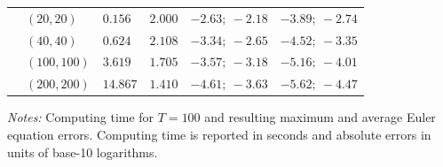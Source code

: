 \documentclass[a4paper,12pt]{article}
\begin{document}
\begin{table}[htb]
\begin{threeparttable}
\begin{tabular}{L{0.1cm}C{2.5cm}C{2cm}C{2cm}C{3cm}C{3cm}}
		& $\left(  20,20  \right)$ &  $0.156$ & $2.000$ & $-2.63;\ -2.18$ & $-3.89;\ -2.74$ \\
		& $\left(  40,40  \right)$ &  $0.624$ & $2.108$ & $-3.34;\ -2.65$ & $-4.52;\ -3.35$ \\
		& $\left( 100,100 \right)$ &  $3.619$ & $1.705$ & $-3.57;\ -3.18$ & $-5.16;\ -4.01$ \\
		& $\left( 200,200 \right)$ & $14.867$ & $1.410$ & $-4.61;\ -3.63$ & $-5.62;\ -4.47$ \\
		\bottomrule
	\end{tabular}
	\begin{tablenotes}
		\footnotesize
		\emph{Notes:} Computing time for $T=100$ and resulting maximum and average Euler equation errors. Computing time is reported in seconds and absolute errors in units of base-10 logarithms.
	\end{tablenotes}
\end{threeparttable}
\end{table}
\end{document}
